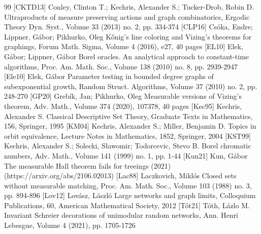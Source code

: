 \documentclass[10pt]{amsart}
\theoremstyle{definition}
\begin{document}
\begin{thebibliography}{99}
 [CKTD13] Conley, Clinton T.; Kechris, Alexander S.; Tucker-Drob, Robin D. Ultraproducts of measure preserving actions and graph combinatorics, Ergodic Theory Dyn. Syst., Volume 33 (2013) no. 2, pp. 334-374
 [CLP16] Csóka, Endre; Lippner, Gábor; Pikhurko, Oleg Kőnig’s line coloring and Vizing’s theorems for graphings, Forum Math. Sigma, Volume 4 (2016), e27, 40 pages
 [EL10] Elek, Gábor; Lippner, Gábor Borel oracles. An analytical approach to constant-time algorithms, Proc. Am. Math. Soc., Volume 138 (2010) no. 8, pp. 2939-2947
 [Ele10] Elek, Gábor Parameter testing in bounded degree graphs of subexponential growth, Random Struct. Algorithms, Volume 37 (2010) no. 2, pp. 248-270
 [GP20] Grebík, Jan; Pikhurko, Oleg Measurable versions of Vizing’s theorem, Adv. Math., Volume 374 (2020), 107378, 40 pages
 [Kec95] Kechris, Alexander S. Classical Descriptive Set Theory, Graduate Texts in Mathematics, 156, Springer, 1995
 [KM04] Kechris, Alexander S.; Miller, Benjamin D. Topics in orbit equivalence, Lecture Notes in Mathematics, 1852, Springer, 2004
 [KST99] Kechris, Alexander S.; Solecki, Sławomir; Todorcevic, Stevo B. Borel chromatic numbers, Adv. Math., Volume 141 (1999) no. 1, pp. 1-44
 [Kun21] Kun, Gábor The measurable Hall theorem fails for treeings (2021) (https://arxiv.org/abs/2106.02013)
 [Lac88] Laczkovich, Miklós Closed sets without measurable matching, Proc. Am. Math. Soc., Volume 103 (1988) no. 3, pp. 894-896
 [Lov12] Lovász, László Large networks and graph limits, Colloquium Publications, 60, American Mathematical Society, 2012
 [Tót21] Tóth, Lázlo M. Invariant Schreier decorations of unimodular random networks, Ann. Henri Lebesgue, Volume 4 (2021), pp. 1705-1726
\end{thebibliography}
\end{document}
